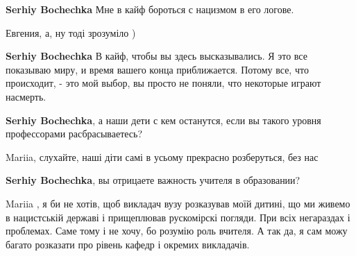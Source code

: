 \begin{itemize}
\begin{itemize}
\textbf{Serhiy Bochechka} Мне в кайф бороться с нацизмом в его логове.

 
Евгения, а, ну тоді зрозуміло )

 
\textbf{Serhiy Bochechka} В кайф, чтобы вы здесь высказывались. Я это все показываю миру, и время вашего конца приближается. Потому все, что происходит, - это мой выбор, вы просто не поняли, что некоторые играют насмерть.

 
\textbf{Serhiy Bochechka}, а наши дети с кем останутся, если вы такого уровня профессорами расбрасываетесь?

 
Mariia, слухайте, наші діти самі в усьому прекрасно розберуться, без нас \Smiley[1.0][yellow]

 
\textbf{Serhiy Bochechka}, вы отрицаете важность учителя в образовании?

 
Mariia , я би не хотів, щоб викладач вузу розказував моїй дитині, що ми живемо в нацистській державі і прищеплював рускомірскі погляди. При всіх негараздах і проблемах. Саме тому і не хочу, бо розумію роль вчителя.
А так да, я сам можу багато розказати про рівень кафедр і окремих викладачів.


\end{itemize}
\end{itemize}
